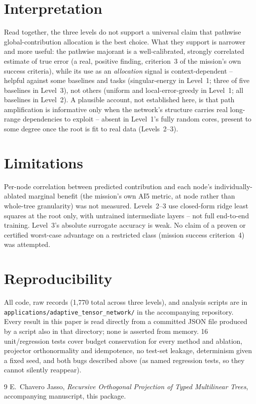 \documentclass[11pt]{amsart}
\theoremstyle{remark}
\theoremstyle{definition}
\begin{document}
\section{Interpretation}

Read together, the three levels do not support a universal claim that pathwise
global-contribution allocation is the best choice. What they support is narrower and more
useful: the pathwise majorant is a well-calibrated, strongly correlated estimate of true
error (a real, positive finding, criterion~3 of the mission's own success criteria), while
its use as an \emph{allocation} signal is context-dependent -- helpful against some
baselines and tasks (singular-energy in Level~1; three of five baselines in Level~3), not
others (uniform and local-error-greedy in Level~1; all baselines in Level~2). A plausible
account, not established here, is that path amplification is informative only when the
network's structure carries real long-range dependencies to exploit -- absent in Level~1's
fully random cores, present to some degree once the root is fit to real data (Levels~2--3).

\section{Limitations}

Per-node correlation between predicted contribution and each node's individually-ablated
marginal benefit (the mission's own AI5 metric, at node rather than whole-tree granularity)
was not measured. Levels~2--3 use closed-form ridge least squares at the root only, with
untrained intermediate layers -- not full end-to-end training. Level~3's absolute surrogate
accuracy is weak. No claim of a proven or certified worst-case advantage on a restricted
class (mission success criterion~4) was attempted.

\section{Reproducibility}

All code, raw records (1{,}770 total across three levels), and analysis scripts are in
\texttt{applications/adaptive\_tensor\_network/} in the accompanying repository. Every
result in this paper is read directly from a committed JSON file produced by a script also
in that directory; none is asserted from memory. 16 unit/regression tests cover budget
conservation for every method and ablation, projector orthonormality and idempotence, no
test-set leakage, determinism given a fixed seed, and both bugs described above (as
named regression tests, so they cannot silently reappear).

\begin{thebibliography}{9}
E.~Chavero Jasso, \emph{Recursive Orthogonal Projection of Typed Multilinear Trees},
accompanying manuscript, this package.
\end{thebibliography}
\end{document}
